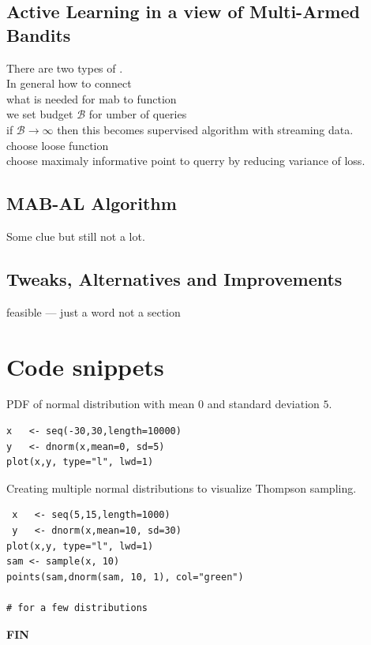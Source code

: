 \documentclass[12pt, a4paper, pdflatex]{report}
\begin{document}
\section{Active Learning in a view of Multi-Armed Bandits}
There are two types of .\\


In general how to connect\\
what is needed for mab to function\\
we set budget $\mathscr{B}$ for umber of queries\\
if $\mathscr{B} \rightarrow \infty$ then this becomes supervised algorithm with streaming data.\\
choose loose function\\
choose maximaly informative point to querry by reducing variance of loss.\\


\section{MAB-AL Algorithm}
Some clue but still not a lot.

\section{Tweaks, Alternatives and Improvements}
feasible --- just a word not a section



\appendix
\chapter{Code snippets}

\label{snip:normaldist}PDF of normal distribution with mean $0$ and standard deviation $5$.
\begin{lstlisting}
x   <- seq(-30,30,length=10000)
y   <- dnorm(x,mean=0, sd=5)
plot(x,y, type="l", lwd=1)
\end{lstlisting}

\label{snip:thompsonsampling}Creating multiple normal distributions to visualize Thompson sampling.
\begin{lstlisting}
 x   <- seq(5,15,length=1000)
 y   <- dnorm(x,mean=10, sd=30)
plot(x,y, type="l", lwd=1)
sam <- sample(x, 10)
points(sam,dnorm(sam, 10, 1), col="green")

# for a few distributions
\end{lstlisting}


\newpage
\begin{center} \textbf{\huge \vspace*{15pt} FIN~\cite{berry+firstedt}} \end{center}

{}

\end{document}
